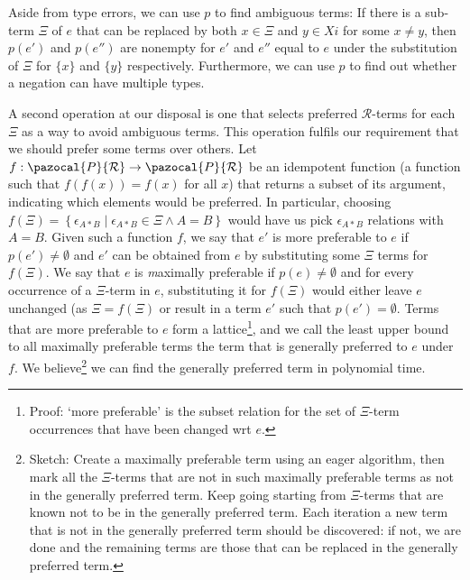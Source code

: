 \documentclass[12pt]{article}
\newcommand{\powerset}{\pazocal{P}}
\begin{document}
Aside from type errors, we can use $p$ to find ambiguous terms:
If there is a sub-term $\Xi$ of $e$ that can be replaced by both $x\in \Xi$ and $y\in Xi$ for some $x \neq y$, then $p(e')$ and $p(e'')$ are nonempty for $e'$ and $e''$ equal to $e$ under the substitution of $\Xi$ for $\{x\}$ and $\{y\}$ respectively.
Furthermore, we can use $p$ to find out whether a negation can have multiple types.

A second operation at our disposal is one that selects preferred $\mathcal{R}$-terms for each $\Xi$ as a way to avoid ambiguous terms.
This operation fulfils our requirement that we should prefer some terms over others.
Let $f : \powerset{\mathcal{R}}\to\powerset{\mathcal{R}}$ be an idempotent function (a function such that $f(f(x))=f(x)$ for all $x$) that returns a subset of its argument, indicating which elements would be preferred.
In particular, choosing $f(\Xi) = \left\{\epsilon_{A*B} \mid \epsilon_{A*B}\in \Xi \wedge A=B\right\}$ would have us pick $\epsilon_{A*B}$ relations with $A=B$.
Given such a function $f$, we say that $e'$ is more preferable to $e$ if $p(e')\neq \emptyset$ and $e'$ can be obtained from $e$ by substituting some $\Xi$ terms for $f(\Xi)$.
We say that $e$ is {\emph maximally preferable} if $p(e)\neq \emptyset$ and for every occurrence of a $\Xi$-term in $e$, substituting it for $f(\Xi)$ would either leave $e$ unchanged (as $\Xi=f(\Xi)$ or result in a term $e'$ such that $p(e')=\emptyset$.
Terms that are more preferable to $e$ form a lattice\footnote{Proof: `more preferable' is the subset relation for the set of $\Xi$-term occurrences that have been changed wrt $e$.}, and we call the least upper bound to all maximally preferable terms the term that is generally preferred to $e$ under $f$.
We believe\footnote{Sketch: Create a maximally preferable term using an eager algorithm, then mark all the $\Xi$-terms that are not in such maximally preferable terms as not in the generally preferred term. Keep going starting from $\Xi$-terms that are known not to be in the generally preferred term. Each iteration a new term that is not in the generally preferred term should be discovered: if not, we are done and the remaining terms are those that can be replaced in the generally preferred term.} we can find the generally preferred term in polynomial time.
\end{document}
